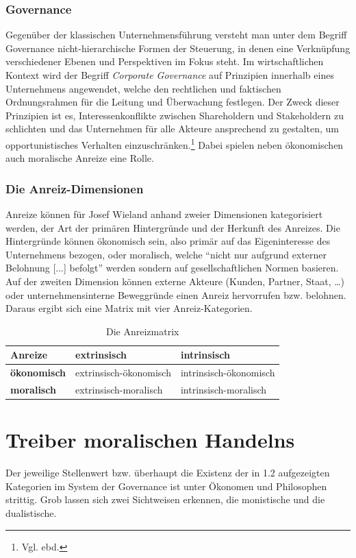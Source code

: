 \documentclass[12pt]{article}
\begin{document}
\section{Governance}
Gegenüber der klassischen Unternehmensführung versteht man unter dem Begriff Governance nicht-hierarchische Formen der Steuerung, in denen eine Verknüpfung verschiedener Ebenen und Perspektiven im Fokus steht. Im wirtschaftlichen Kontext wird der Begriff \textit{Corporate Governance} auf Prinzipien innerhalb eines Unternehmens angewendet, welche den rechtlichen und faktischen Ordnungsrahmen für die Leitung und Überwachung festlegen. Der Zweck dieser Prinzipien ist es, Interessenkonflikte zwischen Shareholdern und Stakeholdern zu schlichten und das Unternehmen für alle Akteure ansprechend zu gestalten, um opportunistisches Verhalten einzuschränken.\footnote{Vgl. ebd.} Dabei spielen neben ökonomischen auch moralische Anreize eine Rolle.

\section{Die Anreiz-Dimensionen}
Anreize können für Josef Wieland anhand zweier Dimensionen kategorisiert werden, der Art der primären Hintergründe und der Herkunft des Anreizes. Die Hintergründe können ökonomisch sein, also primär auf das Eigeninteresse des Unternehmens bezogen, oder moralisch, welche “nicht nur aufgrund externer Belohnung [...] befolgt” werden sondern auf gesellschaftlichen Normen basieren. Auf der zweiten Dimension können externe Akteure (Kunden, Partner, Staat, …) oder unternehmensinterne Beweggründe einen Anreiz hervorrufen bzw. belohnen. Daraus ergibt sich eine Matrix mit vier Anreiz-Kategorien.
\begin{table}[h]
\centering
\begin{tabular}{|p{3cm}|p{5cm}|p{5cm}|}
\hline
Anreize & \textbf{extrinsisch} & \textbf{intrinsisch}\\\hline
\textbf{ökonomisch} & extrinsisch-ökonomisch & intrinsisch-ökonomisch\\\hline
\textbf{moralisch} & extrinsisch-moralisch & intrinsisch-moralisch\\\hline
\end{tabular}
\caption{Die Anreizmatrix}
\end{table}

\part{Treiber moralischen Handelns}
Der jeweilige Stellenwert bzw. überhaupt die Existenz der in 1.2 aufgezeigten Kategorien im System der Governance ist unter Ökonomen und Philosophen strittig. Grob lassen sich zwei Sichtweisen erkennen, die monistische und die dualistische.
\end{document}
